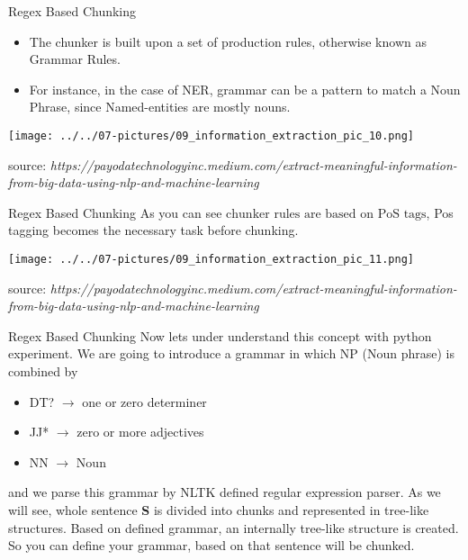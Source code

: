 \documentclass[11pt]{beamer}
\newcommand{\highlight}[1]{%
  \colorbox{yellow!100}{$\displaystyle#1$}}
\begin{document}
\begin{frame}{Regex Based Chunking}
	\begin{itemize}
		\item The chunker is built upon a set of production rules, otherwise known as Grammar Rules. 
		\item For instance, in the case of NER, grammar can be a pattern to match a Noun Phrase, since Named-entities are mostly nouns.
	\end{itemize}
	
	\begin{center}
	\texttt{[image: ../../07-pictures/09\_information\_extraction\_pic\_10.png]}
	\end{center}
\footnotesize{source: \textit{https://payodatechnologyinc.medium.com/extract-meaningful-information-from-big-data-using-nlp-and-machine-learning}}
\end{frame}
\begin{frame}{Regex Based Chunking}
	As you can see \highlight{\text{chunker rules are based on PoS tags}}, Pos tagging becomes the necessary task before chunking.
	\begin{center}
	\texttt{[image: ../../07-pictures/09\_information\_extraction\_pic\_11.png]}
	\end{center}
\footnotesize{source: \textit{https://payodatechnologyinc.medium.com/extract-meaningful-information-from-big-data-using-nlp-and-machine-learning}}
\end{frame}
\begin{frame}{Regex Based Chunking}
Now lets under understand this concept with python experiment. We are going to introduce a grammar in which NP (Noun phrase) is combined by
\begin{itemize}
\item  DT? $\rightarrow$ one or zero determiner
\item  JJ* $\rightarrow$ zero or more adjectives
\item  NN $\rightarrow$ Noun
\end{itemize}
and we parse this grammar by NLTK defined regular expression parser. As we will see, whole sentence \textbf{S} is divided into chunks and represented in tree-like structures. Based on defined grammar, an internally tree-like structure is created. So you can define your grammar, based on that sentence will be chunked.
\end{frame}
\end{document}
